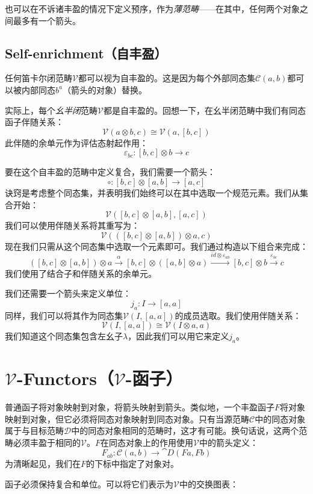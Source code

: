 \documentclass[DaoFP]{subfiles}
\begin{document}
 也可以在不诉诸丰盈的情况下定义预序，作为\emph{薄范畴}——在其中，任何两个对象之间最多有一个箭头。

 \subsection{Self-enrichment（自丰盈）}

 任何笛卡尔闭范畴$\mathcal V$都可以视为自丰盈的。这是因为每个外部同态集$\mathcal C(a, b)$都可以被内部同态$b^a$（箭头的对象）替换。

 实际上，每个\emph{幺半闭}范畴$\mathcal V$都是自丰盈的。回想一下，在幺半闭范畴中我们有同态函子伴随关系：
 \[ \mathcal V (a \otimes b, c) \cong \mathcal V (a, [b, c]) \]
 此伴随的余单元作为评估态射起作用：
 \[ \varepsilon_{b c} \colon [b, c] \otimes b \to c \]

 要在这个自丰盈的范畴中定义复合，我们需要一个箭头：
 \[ \circ \colon [b, c] \otimes [a, b] \to [a, c] \]
 诀窍是考虑整个同态集，并表明我们始终可以在其中选取一个规范元素。我们从集合开始：
 \[ \mathcal V([b, c] \otimes [a, b], [a, c]) \]
 我们可以使用伴随关系将其重写为：
 \[  \mathcal V( ([b, c] \otimes [a, b]) \otimes a, c) \]
 现在我们只需从这个同态集中选取一个元素即可。我们通过构造以下组合来完成：
 \[ ([b, c] \otimes [a, b]) \otimes a \xrightarrow{\alpha}
 [b, c] \otimes ([a, b] \otimes a) \xrightarrow{id \otimes \varepsilon_{a b} }
 [b, c] \otimes b \xrightarrow{\varepsilon_{b c}} c \]
 我们使用了结合子和伴随关系的余单元。

 我们还需要一个箭头来定义单位：
 \[ j_a \colon I \to [a, a] \]
 同样，我们可以将其作为同态集$\mathcal V(I, [a, a])$的成员选取。我们使用伴随关系：
 \[ \mathcal V(I, [a, a]) \cong \mathcal V (I \otimes a, a) \]
 我们知道这个同态集包含左幺子$\lambda$，因此我们可以用它来定义$j_a$。

 \section{$\mathcal V$-Functors（$\mathcal V$-函子）}

 普通函子将对象映射到对象，将箭头映射到箭头。类似地，一个丰盈函子$F$将对象映射到对象，但它必须将同态对象映射到同态对象。只有当源范畴$\mathcal C$中的同态对象属于与目标范畴$\mathcal D$中的同态对象相同的范畴时，这才有可能。换句话说，这两个范畴必须丰盈于相同的$\mathcal V$。$F$在同态对象上的作用使用$\mathcal V$中的箭头定义：
 \[ F_{a b} \colon \mathcal C (a, b) \to \cat D (F a, F b) \]
 为清晰起见，我们在$F$的下标中指定了对象对。

 函子必须保持复合和单位。可以将它们表示为$\mathcal V$中的交换图表：
\end{document}
